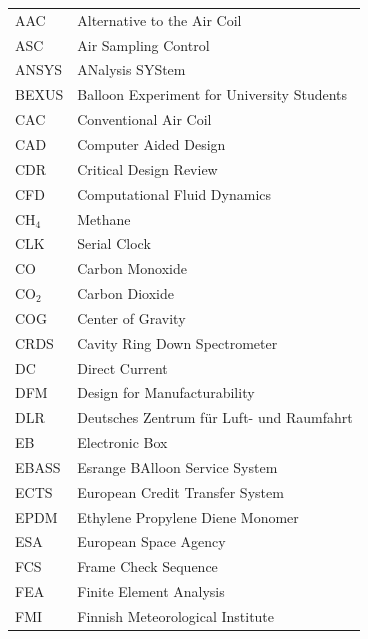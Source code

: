 \documentclass[a4paper,12pt,oneside]{article} %
\providecommand{\DIFaddbegin}{} %
\providecommand{\DIFaddend}{} %
\newcommand{\DIFaddincludegraphics}[2][]{{\color{blue}\fbox{\DIFOincludegraphics[#1]{#2}}}} %
\DeclareRobustCommand{\DIFaddbegin}{\DIFOaddbegin \let\includegraphics\DIFaddincludegraphics} %
\DeclareRobustCommand{\DIFaddend}{\DIFOaddend \let\includegraphics\DIFOincludegraphics} %
\begin{document}

  
    \begin{longtable}{p{3cm} p{9cm}}
            AAC         & Alternative to the Air Coil\\
            ASC         & Air Sampling Control\\
            ANSYS       & ANalysis SYStem\\
            BEXUS       & Balloon Experiment for University Students\\
            CAC         & Conventional Air Coil\\
            CAD         & Computer Aided Design \\
            CDR         & Critical Design Review\\
            CFD         & Computational Fluid Dynamics\\
            CH$_{4}$    & Methane\\
            CLK         & Serial Clock\\
            CO          & Carbon Monoxide\DIFaddbegin \\
            \DIFaddend CO$_{2}$    & Carbon Dioxide\\
            COG         & Center of Gravity \\
            CRDS        & Cavity Ring Down Spectrometer\\
            DC          & Direct Current\\
            DFM         & Design for Manufacturability \\
            DLR         & Deutsches Zentrum f{\"u}r Luft- und Raumfahrt \\
            EB          & Electronic Box \\
            EBASS       & Esrange BAlloon Service System\\
            ECTS        & European Credit Transfer System\\
            EPDM        & Ethylene Propylene Diene Monomer\\
            ESA         & European Space Agency \\
            FCS         & Frame Check Sequence\\
            FEA         & Finite Element Analysis\\
            FMI         & Finnish Meteorological Institute\\

\end{longtable}
\end{document}
